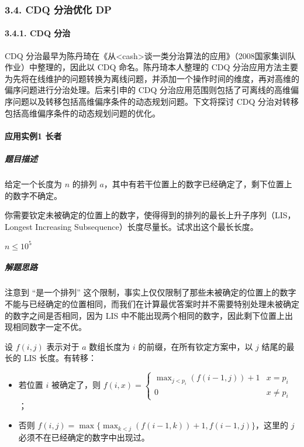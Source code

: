 \subsubsection{3.4. CDQ 分治优化 DP}

\paragraph{3.4.1. CDQ 分治}

CDQ
分治最早为陈丹琦在《从\textless cash\textgreater 谈一类分治算法的应用》（2008国家集训队作业）中整理的，因此以
CDQ 命名。陈丹琦本人整理的 CDQ
分治应用方法主要为先将在线维护的问题转换为离线问题，并添加一个操作时间的维度，再对高维的偏序问题进行分治处理。后来引申的
CDQ
分治应用范围则包括了可离线的高维偏序问题以及转移包括高维偏序条件的动态规划问题。下文将探讨
CDQ 分治对转移包括高维偏序条件的动态规划问题的优化。

\paragraph{应用实例1 长者}

\subparagraph{题目描述}

给定一个长度为 \(n\) 的排列
\(a\)，其中有若干位置上的数字已经确定了，剩下位置上的数字不确定。

你需要钦定未被确定的位置上的数字，使得得到的排列的最长上升子序列（LIS，Longest
Increasing Subsequence）长度尽量长。试求出这个最长长度。

\(n\leq 10^5\)

\subparagraph{解题思路}

注意到 ``是一个排列''
这个限制，事实上仅仅限制了那些未被确定的位置上的数字不能与已经确定的位置相同，而我们在计算最优答案时并不需要特别处理未被确定的数字之间是否相同，因为
LIS 中不能出现两个相同的数字，因此剩下位置上出现相同数字一定不优。

设 \(f(i,j)\) 表示对于 \(a\) 数组长度为 \(i\)
的前缀，在所有钦定方案中，以 \(j\) 结尾的最长的 LIS 长度。有转移：

\begin{itemize}
\item
  若位置 \(i\) 被确定了，则
  \(f(i,x)=\begin{cases}\max_{j\lt p_i}(f(i-1,j))+1&x=p_i\\0&x\not=p_i\end{cases}\)；
\item
  否则 \(f(i,j)=\max\{\max_{k\lt j}(f(i-1,k))+1,f(i-1,j)\}\)，这里的
  \(j\) 必须不在已经确定的数字中出现过。
\end{itemize}

